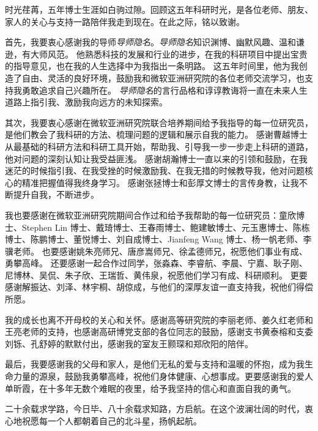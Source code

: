 
\begin{acknowledgements}
  时光荏苒，五年博士生涯如白驹过隙。回顾这五年科研时光，是各位老师、朋友、家人的关心与支持一路陪伴我走到现在。在此之际，铭以致谢。


  首先，我要衷心感谢我的导师\textit{导师隐名}。\textit{导师隐名}知识渊博、幽默风趣、温和谦逊，有大师风范。
  他熟悉科技的发展和行业的进步，在我的科研项目中提出宝贵的指导意见，也在我的人生选择中为我指出一条明路。
  这五年时间里，他为我创造了自由、灵活的良好环境，鼓励我和微软亚洲研究院的各位老师交流学习，也支持我勇敢追求自己兴趣所在。
  \textit{导师隐名}的言行品格和谆谆教诲将一直在未来人生道路上指引我、激励我向远方的未知探索。
  
  其次，我要衷心感谢在微软亚洲研究院联合培养期间给予我指导的每一位研究员，是他们教会了我科研的方法、梳理问题的逻辑和展示自我的能力。
  感谢曹越博士从最基础的科研方法和科研工具开始，帮助我、引导我一步一步走上科研的道路，他对问题的深刻认知让我受益匪浅。
  感谢胡瀚博士一直以来的引领和鼓励，在我迷茫的时候指引我、在我受挫的时候激励我、在我无措的时候教导我，他对问题核心的精准把握值得我终身学习。
  感谢张拯博士和彭厚文博士的言传身教，让我不断提升自我，不断进步。

  我也要感谢在微软亚洲研究院期间合作过和给予我帮助的每一位研究员：童欣博士、Stephen Lin 博士、戴琦博士、王春雨博士、鲍建敏博士、元玉惠博士、陈栋博士、陈鹏博士、董悦博士、刘自成博士、Jianfeng Wang 博士、杨一帆老师、李骥老师。
  也要感谢姚朱亮师兄、唐彦嵩师兄、徐孟德师兄，祝愿他们事业有成、勇攀高峰。
  还要感谢一起合作过同学，张淼森、李睿航、李晨、宁嘉、耿子刚、尼博林、吴侃、朱子欣、王瑞哲、黄伟泉，祝愿他们学习有成、科研顺利。
  更要感谢解振达、刘泽、林宇桐、胡倞成，与他们的深厚友谊一直支持我，祝他们得偿所愿。

  我的成长也离不开母校的关心和关怀。感谢高等研究院的李丽老师、姜久红老师和王亮老师的支持，也感谢高研博党支部的各位同志的鼓励，感谢支书黄泰榕和支委刘铄、孔舒婷的默默付出，感谢我的室友王颢琛和郑欣阳的陪伴。

  最后，我要感谢我的父母和家人，是他们无私的爱与支持和温暖的怀抱，成为我生命力量的源泉，鼓励我勇攀高峰，祝他们身体健康、心想事成。更要感谢我的爱人单昕霞，在十多年无数个难眠的夜里，给予我坚持的信心和直面自我的勇气。

  二十余载求学路，今日毕、八十余载求知路，方启航。在这个波澜壮阔的时代，衷心地祝愿每一个人都朝着自己的北斗星，扬帆起航。
  
  
\end{acknowledgements}
